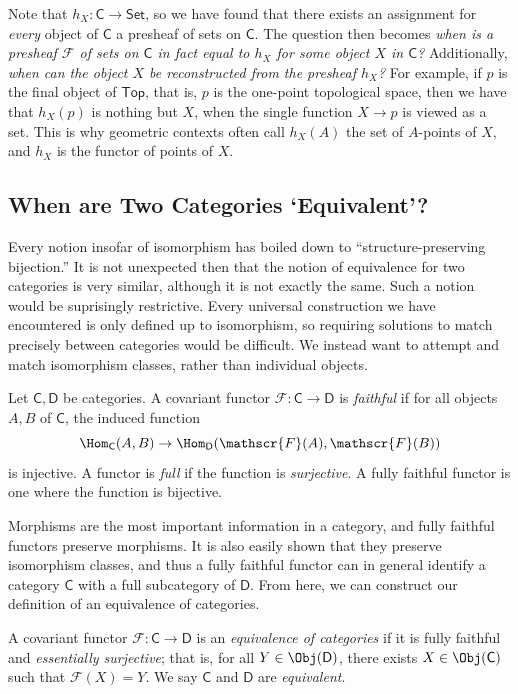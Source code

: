 Note that $h_X : \mathsf{C}  \to \mathsf{Set} $, so we have found that there exists an assignment for \emph{every} object of $\mathsf{C} $ a presheaf of sets on $\mathsf{C} $. The question then becomes \emph{when is a presheaf $\mathscr{F} $ of sets on $\mathsf{C} $ in fact equal to $h_X$ for some object $X$ in $\mathsf{C} $?} Additionally, \emph{when can the object $X$ be reconstructed from the presheaf $h_X$?} For example, if $p$ is the final object of $\mathsf{Top} $, that is, $p$ is the one-point topological space, then we have that $h_X(p)$ is nothing but $X$, when the single function $X\to p$ is viewed as a set. This is why geometric contexts often call $h_X(A)$ the set of $A$-points of $X$, and $h_X$ is the functor of points of $X$.

\subsection{When are Two Categories `Equivalent'?}
Every notion insofar of isomorphism has boiled down to ``structure-preserving bijection.'' It is not unexpected then that the notion of equivalence for two categories is very similar, although it is not exactly the same. Such a notion would be suprisingly restrictive. Every universal construction we have encountered is only defined up to isomorphism, so requiring solutions to match precisely between categories would be difficult. We instead want to attempt and match isomorphism classes, rather than individual objects.
\begin{definition}\label{dfn:8.2}
	Let $\mathsf{C} ,\mathsf{D} $ be categories. A covariant functor $\mathscr{F} : \mathsf{C}  \to \mathsf{D} $ is \emph{faithful} if for all objects $A,B$ of $\mathsf{C} $, the induced function
	\[
		\Hom_{\mathsf{C} }(A, B) \to \Hom_{\mathsf{D} }(\mathscr{F} (A), \mathscr{F} (B)) 
	\]
	is injective. A functor is \emph{full} if the function is \emph{surjective}. A fully faithful functor is one where the function is bijective.
\end{definition}

Morphisms are the most important information in a category, and fully faithful functors preserve morphisms. It is also easily shown that they preserve isomorphism classes, and thus a fully faithful functor can in general identify a category $\mathsf{C} $ with a full subcategory of $\mathsf{D} $. From here, we can construct our definition of an equivalence of categories.
\begin{definition}\label{dfn:8.3}
	A covariant functor $\mathscr{F} : \mathsf{C}  \to \mathsf{D} $ is an \emph{equivalence of categories} if it is fully faithful and \emph{essentially surjective}; that is, for all $Y\in \Obj(\mathsf{D} ) $, there exists $X\in \Obj(\mathsf{C} ) $ such that $\mathscr{F} \left(X \right) =Y$. We say $\mathsf{C} $ and $\mathsf{D} $ are \emph{equivalent}.
\end{definition}


